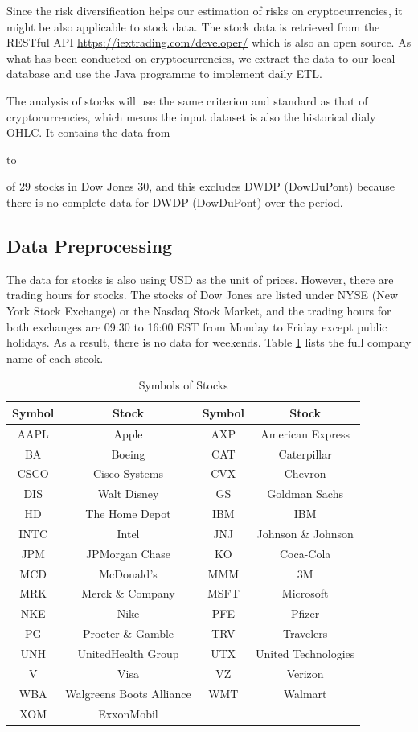 \documentclass[11pt]{article} %
\theoremstyle{plain}
\theoremstyle{definition}
\begin{document}
Since the risk diversification helps our estimation of risks on cryptocurrencies, it might be also applicable to stock data. The stock data is retrieved from the RESTful API \url{https://iextrading.com/developer/}\cite{iextrading} which is also an open source. As what has been conducted on cryptocurrencies, we extract the data to our local database and use the Java programme to implement daily ETL.

The analysis of stocks will use the same criterion and standard as that of cryptocurrencies, which means the input dataset is also the historical dialy OHLC. It contains the data from \date{1st January 2016} to \date{31st July 2018} of 29 stocks in Dow Jones 30, and this excludes DWDP (DowDuPont) because there is no complete data for DWDP (DowDuPont) over the period.

\subsection{Data Preprocessing}

The data for stocks is also using USD as the unit of prices. However, there are trading hours for stocks. The stocks of Dow Jones are listed under NYSE (New York Stock Exchange) or the Nasdaq Stock Market, and the trading hours for both exchanges are 09:30 to 16:00 EST from Monday to Friday except public holidays. As a result, there is no data for weekends. Table \ref{table:symbolstock} lists the full company name of each stcok.

{
  \begin{table}[ht]
    \centering
    \small
    \begin{tabular}{|c|c|c|c|}
        \hline
        Symbol & Stock & Symbol & Stock \\
        \hline
        AAPL & Apple & AXP & American Express \\
        BA & Boeing & CAT & Caterpillar \\
        CSCO & Cisco Systems & CVX & Chevron \\
        DIS & Walt Disney & GS & Goldman Sachs \\
        HD & The Home Depot & IBM & IBM \\
        INTC & Intel & JNJ & Johnson \& Johnson \\
        JPM & JPMorgan Chase & KO & Coca-Cola \\
        MCD & McDonald's & MMM & 3M \\
        MRK & Merck \& Company & MSFT & Microsoft \\
        NKE & Nike & PFE & Pfizer \\
        PG & Procter \& Gamble & TRV & Travelers \\
        UNH & UnitedHealth Group & UTX & United Technologies \\
        V & Visa & VZ & Verizon \\
        WBA & Walgreens Boots Alliance & WMT & Walmart \\
        XOM & ExxonMobil & & \\
        \hline
    \end{tabular}
    \caption{Symbols of Stocks}
    \label{table:symbolstock}
  \end{table}
}
\end{document}
